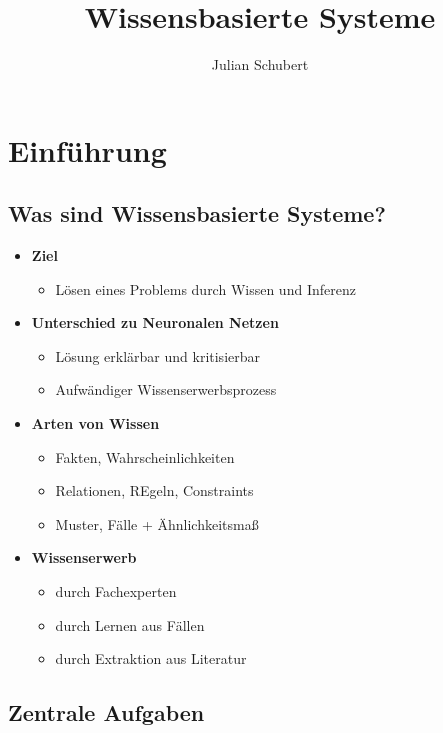 \documentclass[14pt]{article}
\title{Wissensbasierte Systeme}
\author{Julian Schubert}
\begin{document}
\maketitle
\tableofcontents

\newpage

\section{Einführung}
\subsection{Was sind Wissensbasierte Systeme?}
\begin{itemize}
    \item \textbf{Ziel}
          \begin{itemize}
              \item Lösen eines Problems durch Wissen und Inferenz
          \end{itemize}
    \item \textbf{Unterschied zu Neuronalen Netzen}
          \begin{itemize}
              \item Lösung erklärbar und kritisierbar
              \item Aufwändiger Wissenserwerbsprozess
          \end{itemize}
    \item \textbf{Arten von Wissen}
          \begin{itemize}
              \item Fakten, Wahrscheinlichkeiten
              \item Relationen, REgeln, Constraints
              \item Muster, Fälle + Ähnlichkeitsmaß
          \end{itemize}
    \item \textbf{Wissenserwerb}
          \begin{itemize}
              \item durch Fachexperten
              \item durch Lernen aus Fällen
              \item durch Extraktion aus Literatur
          \end{itemize}
\end{itemize}

\subsection{Zentrale Aufgaben}
\end{document}
